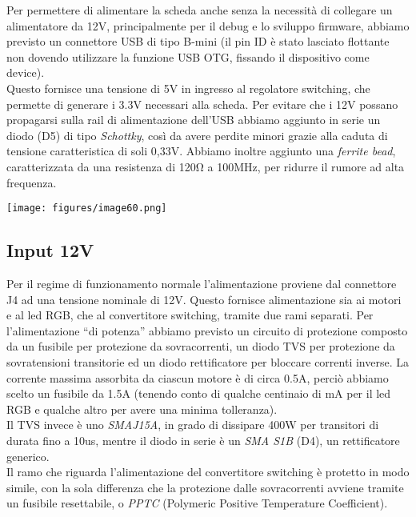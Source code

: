 Per permettere di alimentare la scheda anche senza la necessità di collegare un 
alimentatore da 12V, principalmente per il debug e lo sviluppo firmware, abbiamo 
previsto un connettore USB di tipo B-mini (il pin ID è stato lasciato flottante non 
dovendo utilizzare la funzione USB OTG, fissando il dispositivo come device).\\
Questo fornisce una tensione di 5V in ingresso al regolatore switching, che permette di generare i 3.3V 
necessari alla scheda. Per evitare che i 12V possano propagarsi sulla rail di alimentazione dell’USB abbiamo 
aggiunto in serie un diodo (D5) di tipo \emph{Schottky}, così da avere perdite minori grazie alla caduta di tensione 
caratteristica di soli 0,33V.
Abbiamo inoltre aggiunto una \emph{ferrite bead}, caratterizzata da una resistenza di 120Ω a 100MHz, per
ridurre il rumore ad alta frequenza.

\begin{center}
\texttt{[image: figures/image60.png]}
\captionsetup{type=figure}
\end{center}

\hypertarget{input-12V}{%
\subsection{\texorpdfstring{Input 12V}{Input 12V}}\label{input-12V}}

Per il regime di funzionamento normale l’alimentazione proviene dal connettore J4 ad una tensione nominale di 12V. 
Questo fornisce alimentazione sia ai motori e al led RGB, che al convertitore switching, tramite due rami separati.
Per l’alimentazione “di potenza” abbiamo previsto un circuito di protezione composto da un fusibile per protezione da sovracorrenti, 
un diodo TVS per protezione da sovratensioni transitorie ed un diodo rettificatore per bloccare correnti inverse. La corrente massima assorbita da 
ciascun motore è di circa 0.5A, perciò abbiamo scelto un fusibile da 1.5A (tenendo conto di qualche centinaio di mA per il led RGB 
e qualche altro per avere una minima tolleranza).\\
Il TVS invece è uno \emph{SMAJ15A}, in grado di dissipare 400W per transitori di durata fino a 10us, mentre il diodo in serie è un \textit{SMA S1B}
(D4), un rettificatore generico.\\
Il ramo che riguarda l’alimentazione del convertitore switching è protetto in modo simile, con la sola differenza che la protezione 
dalle sovracorrenti avviene tramite un fusibile resettabile, o \textit{PPTC} (Polymeric Positive Temperature Coefficient).


